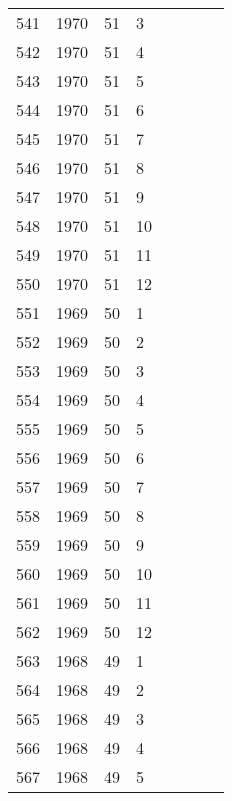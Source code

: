 \begin{longtable}{ |l|l|l|l|l|l|l|l| }
541 & 1970 & 51 &     3 &         &                &  & \\
542 & 1970 & 51 &     4 &         &                &  & \\
543 & 1970 & 51 &     5 &         &                &  & \\
544 & 1970 & 51 &     6 &         &                &  & \\
545 & 1970 & 51 &     7 &         &                &  & \\
546 & 1970 & 51 &     8 &         &                &  & \\
547 & 1970 & 51 &     9 &         &                &  & \\
548 & 1970 & 51 &    10 &         &                &  & \\
549 & 1970 & 51 &    11 &         &                &  & \\
550 & 1970 & 51 &    12 &         &                &  & \\
551 & 1969 & 50 &     1 &         &                &  & \\
552 & 1969 & 50 &     2 &         &                &  & \\
553 & 1969 & 50 &     3 &         &                &  & \\
554 & 1969 & 50 &     4 &         &                &  & \\
555 & 1969 & 50 &     5 &         &                &  & \\
556 & 1969 & 50 &     6 &         &                &  & \\
557 & 1969 & 50 &     7 &         &                &  & \\
558 & 1969 & 50 &     8 &         &                &  & \\
559 & 1969 & 50 &     9 &         &                &  & \\
560 & 1969 & 50 &    10 &         &                &  & \\
561 & 1969 & 50 &    11 &         &                &  & \\
562 & 1969 & 50 &    12 &         &                &  & \\
563 & 1968 & 49 &     1 &         &                &  & \\
564 & 1968 & 49 &     2 &         &                &  & \\
565 & 1968 & 49 &     3 &         &                &  & \\
566 & 1968 & 49 &     4 &         &                &  & \\
567 & 1968 & 49 &     5 &         &                &  & \\

\end{longtable}

